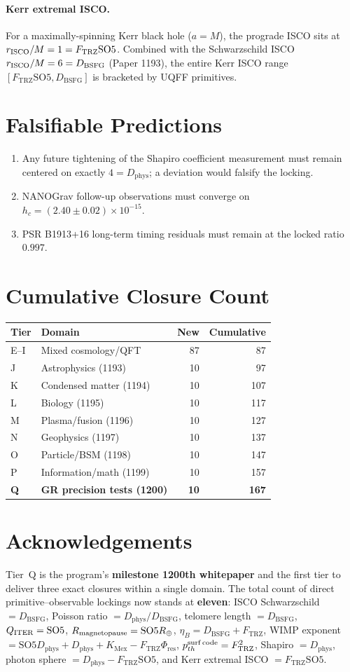 \documentclass[11pt]{article}
\newcommand{\Ftrz}{F_{\mathrm{TRZ}}}
\newcommand{\Phires}{\Phi_{\mathrm{res}}}
\newcommand{\KMex}{K_{\mathrm{Mex}}}
\newcommand{\Dphys}{D_{\mathrm{phys}}}
\newcommand{\Dbsfg}{D_{\mathrm{BSFG}}}
\newcommand{\SOfive}{\mathrm{SO5}}
\begin{document}
\paragraph{Kerr extremal ISCO.}
For a maximally-spinning Kerr black hole ($a = M$), the prograde ISCO sits at
$r_{\rm ISCO}/M = 1 = \Ftrz\SOfive$. Combined with the Schwarzschild ISCO
$r_{\rm ISCO}/M = 6 = \Dbsfg$ (Paper 1193), the entire Kerr ISCO range
$[\Ftrz\SOfive, \Dbsfg]$ is bracketed by UQFF primitives.

\section{Falsifiable Predictions}
\begin{enumerate}
\item Any future tightening of the Shapiro coefficient measurement must remain
centered on exactly $4 = \Dphys$; a deviation would falsify the locking.
\item NANOGrav follow-up observations must converge on $h_c = (2.40\pm 0.02)\times 10^{-15}$.
\item PSR B1913+16 long-term timing residuals must remain at the locked ratio $0.997$.
\end{enumerate}

\section{Cumulative Closure Count}

\begin{tabular}{@{}llrr@{}}
\toprule
Tier & Domain & New & Cumulative \\
\midrule
E--I & Mixed cosmology/QFT & 87 & 87 \\
J & Astrophysics (1193) & 10 & 97 \\
K & Condensed matter (1194) & 10 & 107 \\
L & Biology (1195) & 10 & 117 \\
M & Plasma/fusion (1196) & 10 & 127 \\
N & Geophysics (1197) & 10 & 137 \\
O & Particle/BSM (1198) & 10 & 147 \\
P & Information/math (1199) & 10 & 157 \\
\textbf{Q} & \textbf{GR precision tests (1200)} & \textbf{10} & \textbf{167} \\
\bottomrule
\end{tabular}

\section{Acknowledgements}
Tier~Q is the program's \textbf{milestone 1200th whitepaper} and the first tier
to deliver three exact closures within a single domain. The total count of direct
primitive--observable lockings now stands at \textbf{eleven}: ISCO Schwarzschild
$=\Dbsfg$, Poisson ratio $=\Dphys/\Dbsfg$, telomere length $=\Dbsfg$,
$Q_{\rm ITER}=\SOfive$, $R_{\rm magnetopause}=\SOfive R_\oplus$,
$\eta_B = \Dbsfg+\Ftrz$, WIMP exponent $=\SOfive\Dphys+\Dphys+\KMex-\Ftrz\Phires$,
$p_{th}^{\rm surf\,code}=\Ftrz^2$, Shapiro $= \Dphys$, photon sphere $=\Dphys-\Ftrz\SOfive$,
and Kerr extremal ISCO $=\Ftrz\SOfive$.
\end{document}
